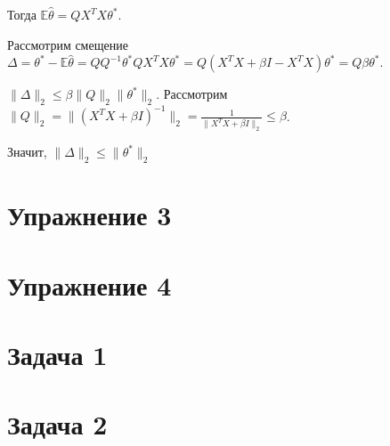 \documentclass[a4paper]{article}
\newcommand{\E}{\mathbb{E}}
\begin{document}
Тогда $\E\hat{\theta}=QX^TX\theta^*$.

Рассмотрим смещение $\Delta=\theta^*-\E\hat{\theta}=QQ^{-1}\theta^*QX^TX\theta^*=Q(X^TX+\beta I-X^TX)\theta^*=Q\beta\theta^*$.

$\|\Delta\|_2\leqslant \beta \|Q\|_2\|\theta^*\|_2$. Рассмотрим $\|Q\|_2=\|(X^TX+\beta I)^{-1}\|_2=\frac{1}{\|X^TX+\beta I\|_2}\leqslant \beta$.

Значит, $\|\Delta\|_2\leqslant \|\theta^*\|_2$
\section*{Упражнение 3}
\section*{Упражнение 4}
\section*{Задача 1}
\section*{Задача 2}
\end{document}
